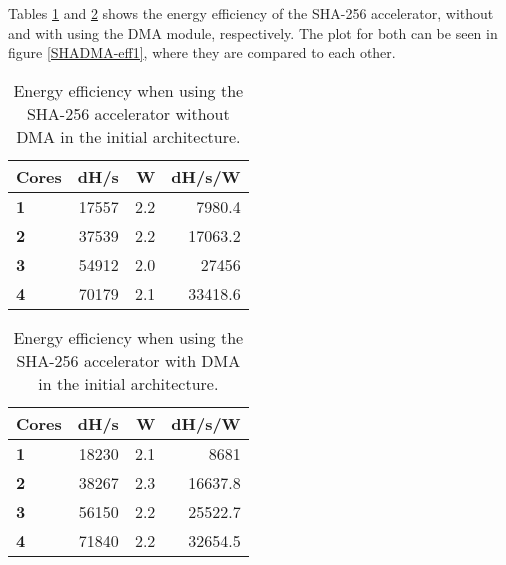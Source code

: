 \begin{appendix}
Tables \ref{tab:SHA-eff1} and \ref{tab:SHADMA-eff1} shows the energy efficiency of the SHA-256 accelerator, without and with using the DMA module, respectively.
The plot for both can be seen in figure \ref{SHADMA-eff1}, where they are compared to each other.

%

\begin{table}
\centering
\begin{tabular}{| l | r | r || r |}
  \hline 
  \textbf{Cores} & \textbf{dH/s} & \textbf{W} & \textbf{dH/s/W} \\
  \hline                       
  \textbf{1} &  17557 & 2.2 & 7980.4\\
  \textbf{2} &  37539 & 2.2 & 17063.2\\
  \textbf{3} &  54912 & 2.0 & 27456\\
  \textbf{4} &  70179 & 2.1 & 33418.6\\
  \hline 
\end{tabular}
\caption{Energy efficiency when using the SHA-256 accelerator without DMA in the initial architecture.}
\label{tab:SHA-eff1}
\end{table}

\begin{table}
\centering
\begin{tabular}{| l | r | r || r |}
  \hline 
  \textbf{Cores} & \textbf{dH/s} & \textbf{W} & \textbf{dH/s/W} \\
  \hline                       
  \textbf{1} &  18230 & 2.1 & 8681\\
  \textbf{2} &  38267 & 2.3 & 16637.8\\
  \textbf{3} &  56150 & 2.2 & 25522.7\\
  \textbf{4} &  71840 & 2.2 & 32654.5\\
  \hline 
\end{tabular}
\caption{Energy efficiency when using the SHA-256 accelerator with DMA in the initial architecture.}
\label{tab:SHADMA-eff1}
\end{table}


\end{appendix}
